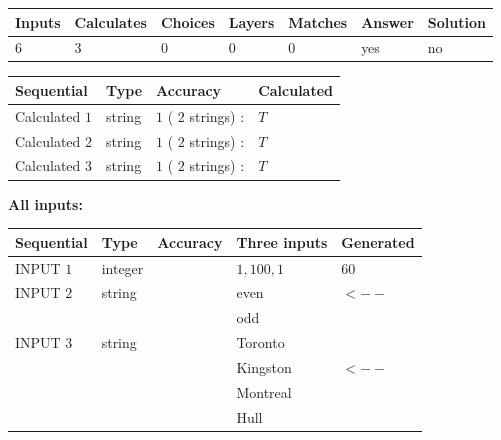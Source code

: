 \documentclass[12pt]{article}
\begin{document}
   
\noindent\begin{tabular}{|l|l|l|l|l|l|l|}
 \hline
Inputs & Calculates & Choices & Layers & Matches & Answer & Solution \\ \hline
           6 & 
           3 & 
           0
  & 
           0 & 
           0 & 
  yes & 
  no 
  \\ \hline
 \end{tabular}
   
   
   
   
\noindent{}
   
   
  
  
\noindent\begin{tabular}{|l|l|l|l|}
\hline
 Sequential & Type & Accuracy & Calculated \\ 
\hline
 
 
  Calculated $           1$ & string & $           1 $ ( $          2 $ strings)
 : 
 & $T$
 \\  \hline  
 
 
  Calculated $           2$ & string & $           1 $ ( $          2 $ strings)
 : 
 & $T$
 \\  \hline  
 
 
  Calculated $           3$ & string & $           1 $ ( $          2 $ strings)
 : 
 & $T$
 \\  \hline  
 \end{tabular}
   
   
   
   
\noindent\vspace{0.1in}\hspace{-0.08in} {\textbf{\Large{All inputs: }}}
   
   
  
  
\noindent\begin{tabular}{|l|l|l|l|l|}
\hline
 Sequential & Type & Accuracy & Three inputs & Generated \\ 
\hline
 
 
  INPUT $           1$ & integer &  & $
 1
 , 
 100
 , 
 1
 $ & $ 60 $ 
 \\  \hline  
 
 
  INPUT $           2$ & string & & 
 even & 
  $ <-- $ 
  \\
  & & & 
 odd & 
 \\  \hline  
 
 
  INPUT $           3$ & string & & 
 Toronto & 
  \\
  & & & 
 Kingston & 
  $ <-- $ 
  \\
  & & & 
 Montreal & 
  \\
  & & & 
 Hull & 
 \\  \hline  
 \end{tabular}
   
\end{document}
